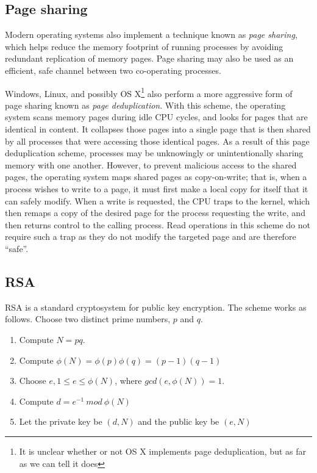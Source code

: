\documentclass[11pt]{llncs}
\begin{document}
\subsection{Page sharing} %

Modern operating systems also implement a technique known as \textit{page
sharing}, which helps reduce the memory footprint of running processes by
avoiding redundant replication of memory pages. Page sharing may also be used as
an efficient, safe channel between two co-operating processes.

Windows, Linux, and possibly OS X\footnote{It is unclear whether or not OS X
implements page deduplication, but as far as we can tell it does} also perform a
more aggressive form of page sharing known as \textit{page deduplication}. With
this scheme, the operating system scans memory pages during idle CPU cycles, and
looks for pages that are identical in content. It collapses those pages into a
single page that is then shared by all processes that were accessing those
identical pages. As a result of this page deduplication scheme,
processes may be unknowingly or unintentionally sharing memory with one another.
However, to prevent malicious access to the shared pages, the operating system
maps shared pages as copy-on-write; that is, when a process wishes to write to a
page, it must first make a local copy for itself that it can safely modify. When
a write is requested, the CPU traps to the kernel, which then remaps a copy of
the desired page for the process requesting the write, and then returns control
to the calling process. Read operations in this scheme do not require such a trap
as they do not modify the targeted page and are therefore ``safe''.

\subsection{RSA}

RSA is a standard cryptosystem for public key encryption. The scheme works as
follows. Choose two distinct prime numbers, $p$ and $q$.

\begin{enumerate}
    \item Compute $N = pq$.
    \item Compute $\phi(N) = \phi(p)\phi(q) = (p-1)(q-1)$
    \item Choose $e, 1 \leq e \leq \phi(N)$, where $gcd(e,\phi(N)) = 1$.
    \item Compute $d = e^{-1}\ mod\ \phi(N)$
    \item Let the private key be $(d,N)$ and the public key be $(e,N)$
\end{enumerate} 
\end{document}

